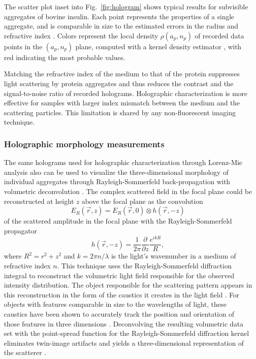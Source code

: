 The scatter plot inset into Fig.~\ref{fig:hologram} shows typical results
for subvisible aggregates of bovine insulin.
Each point represents the properties of a single aggregate,
and is comparable in size to the estimated errors in the
radius and refractive index \cite{lee07a,krishnatreya14}.
Colors represent the local density $\rho(a_p,n_p)$ of recorded data
points in the $(a_p, n_p)$ plane, computed with a kernel density
estimator \cite{silverman92}, with red indicating the most
probable values.

Matching the refractive index of the medium to that of the protein suppresses light scattering by protein aggregates and thus reduces the contrast and the signal-to-noise ratio of recorded holograms. Holographic characterization is more effective for samples with larger index mismatch between the medium and the scattering particles. This limitation is shared by any non-fluorescent imaging technique.

\subsubsection{Holographic morphology measurements}

The same holograms used for holographic characterization through
Lorenz-Mie analysis also can be used to visualize the
three-dimensional morphology of individual aggregates through
Rayleigh-Sommerfeld back-propagation \cite{lee07} with 
volumetric deconvolution \cite{dixon11a}.
The complex scattered field in the focal plane could be reconstructed at 
height $z$ above the focal plane as the convolution
\begin{equation}
	E_R(\vec{r},z)=E_R(\vec{r},0) \otimes h(\vec{r},-z)
\end{equation}
of the scattered amplitude in the focal plane with the Rayleigh-Sommerfeld
propagator \cite{goodman05}
\begin{equation}
	h(\vec{r},-z)=\frac{1}{2\pi} \frac{\partial}{\partial z} \frac{e^{ikR}}{R},
\end{equation}
where $R^2 = r^2 + z^2$ and $k = 2 \pi n/\lambda$ is the light's wavenumber in a medium of refractive index $n$.
This technique uses the Rayleigh-Sommerfeld diffraction integral
to reconstruct the volumetric light field responsible for the
observed intensity distribution.
The object responsible for the scattering pattern appears in this
reconstruction in the form of the caustics it creates in the light
field \cite{lee07,cheong10a}.
For objects with features comparable in size to the wavelengths of
light, these caustics have been shown to accurately track the position
and orientation of those features in three dimensions \cite{cheong10}.
Deconvolving the resulting volumetric data set with the point-spread
function for the Rayleigh-Sommerfeld diffraction kernel
eliminates twin-image artifacts and yields a three-dimensional
representation of the scatterer \cite{dixon11a}.

